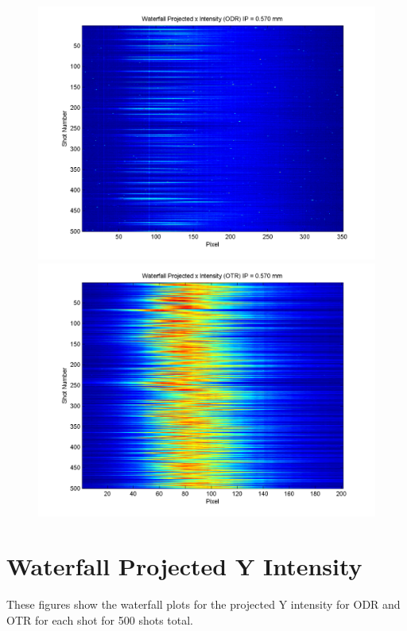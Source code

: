 \documentclass[12pt]{article}
\begin{document}
\begin{figure}
\begin{center}
\includegraphics[scale=0.5]{Figures/ProjX_wfall_ODR_570.PNG}
\includegraphics[scale=0.5]{Figures/ProjX_wfall_OTR_570.PNG}
\caption{}
\end{center}
\end{figure}



\newpage

\section{Waterfall Projected Y Intensity}

These figures show the waterfall plots for the projected Y intensity for ODR and OTR for each shot for 500 shots total.
\end{document}
